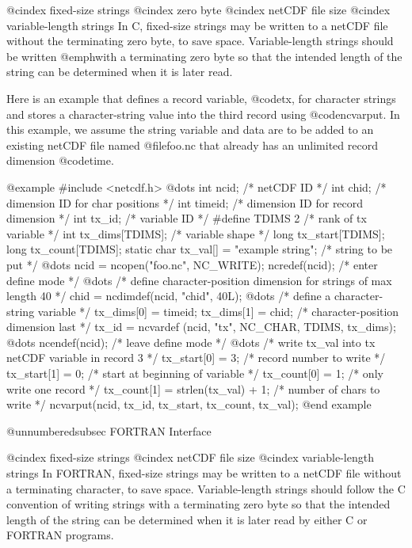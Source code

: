 @cindex fixed-size strings
@cindex zero byte
@cindex netCDF file size
@cindex variable-length strings
In C, fixed-size strings may be written to a netCDF file without the
terminating zero byte, to save space.  Variable-length strings should be
written @emph{with} a terminating zero byte so that the intended length
of the string can be determined when it is later read.

Here is an example that defines a record variable, @code{tx}, for
character strings and stores a character-string value into the third
record using @code{ncvarput}.  In this example, we assume the string
variable and data are to be added to an existing netCDF file named
@file{foo.nc} that already has an unlimited record dimension @code{time}.

@example
#include <netcdf.h>
   @dots{}
int  ncid;            /* netCDF ID */
int  chid;            /* dimension ID for char positions */
int  timeid;          /* dimension ID for record dimension */
int  tx_id;           /* variable ID */
#define TDIMS 2       /* rank of tx variable */
int tx_dims[TDIMS];   /* variable shape */
long tx_start[TDIMS];
long tx_count[TDIMS];
static char tx_val[] =
        "example string"; /* string to be put */
   @dots{}
ncid = ncopen("foo.nc", NC_WRITE);
ncredef(ncid);       /* enter define mode */
   @dots{}
/* define character-position dimension for strings of max length 40 */
chid = ncdimdef(ncid, "chid", 40L);
   @dots{}
/* define a character-string variable */
tx_dims[0] = timeid;
tx_dims[1] = chid;    /* character-position dimension last */
tx_id = ncvardef (ncid, "tx", NC_CHAR, TDIMS, tx_dims);
   @dots{}
ncendef(ncid);       /* leave define mode */
   @dots{}
/* write tx_val into tx netCDF variable in record 3 */
tx_start[0] = 3;      /* record number to write */
tx_start[1] = 0;      /* start at beginning of variable */
tx_count[0] = 1;      /* only write one record */
tx_count[1] = strlen(tx_val) + 1;  /* number of chars to write */
ncvarput(ncid, tx_id, tx_start, tx_count, tx_val);
@end example

@unnumberedsubsec FORTRAN Interface

@cindex fixed-size strings
@cindex netCDF file size
@cindex variable-length strings
In FORTRAN, fixed-size strings may be written to a netCDF file without a
terminating character, to save space.  Variable-length strings
should follow the C convention of writing strings with a terminating
zero byte so that the intended length of the string can be determined
when it is later read by either C or FORTRAN programs.


